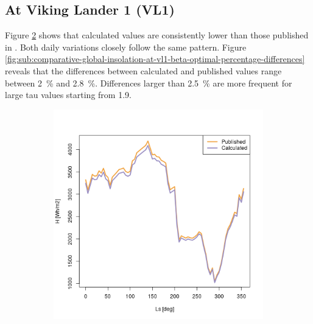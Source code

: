 \subsection{At Viking Lander 1 (VL1)}
Figure \ref{fig:sub:comparative-global-insolation-at-vl1-beta-optimal-daily-variations} shows that calculated values are consistently lower than those published in . Both daily variations closely follow the same pattern. Figure \ref{fig:sub:comparative-global-insolation-at-vl1-beta-optimal-percentage-differences} reveals that the differences between calculated and published values range between \SI{2}{\percent} and \SI{2.8}{\percent}. Differences larger than \SI{2.5}{\percent} are more frequent for large tau values starting from 1.9.

\begin{figure}[H]
\captionsetup[subfigure]{justification=centering}
\vspace{-2ex}
\centering
    \setlength{\subfigureWidth}{0.50\textwidth}
    \setlength{\graphicsHeight}{80mm}
    \hypersetup{hidelinks=true}%
    \begin{subfigure}[t]{\subfigureWidth}
        \centering
            \includegraphics[height=\graphicsHeight]{sections/appendix/A/plots/h-exp-calc-at-vl1-with-beta-65-deg.png}
            \label{fig:sub:comparative-global-insolation-at-vl1-beta-optimal-daily-variations}

\end{subfigure}
\end{figure}
